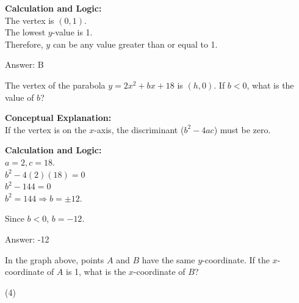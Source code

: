 \documentclass[11pt,paper=a4,answers]{exam}
\begin{document}
\begin{questions}
\begin{solution}
\vspace{20pt}

\textbf{Calculation and Logic:} \\
The vertex is $(0, 1)$. \\
The lowest $y$-value is 1. \\
Therefore, $y$ can be any value greater than or equal to 1.

\vspace{25pt}

Answer: \colorbox{yellow!100}{B}
\end{solution}

\vspace{40pt}

\question
The vertex of the parabola $y = 2x^2 + bx + 18$ is $(h, 0)$. If $b < 0$, what is the value of $b$?

\begin{solution}
\textbf{Conceptual Explanation:} \\
If the vertex is on the $x$-axis, the discriminant ($b^2 - 4ac$) must be zero.

\vspace{20pt}

\textbf{Calculation and Logic:} \\
$a = 2, c = 18$. \\
$b^2 - 4(2)(18) = 0$ \\
$b^2 - 144 = 0$ \\
$b^2 = 144 \Rightarrow b = \pm 12$.

\vspace{10pt}

Since $b < 0$, $b = -12$.

\vspace{25pt}

Answer: \colorbox{yellow!100}{-12}
\end{solution}

\vspace{40pt}

\question
\begin{center}
\end{center}
In the graph above, points $A$ and $B$ have the same $y$-coordinate. If the $x$-coordinate of $A$ is 1, what is the $x$-coordinate of $B$?
\begin{tasks}(4)
\end{tasks}


\end{questions}
\end{document}
